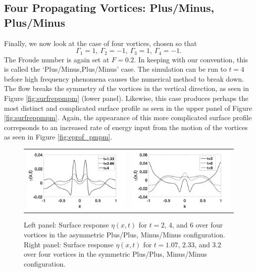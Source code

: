 \documentclass[a4paper,11pt]{article}
\begin{document}
\subsection{Four Propagating Vortices: Plus/Minus, Plus/Minus}
Finally, we now look at the case of four vortices, chosen so that
\[
\Gamma_{1}=1,~\Gamma_{2}=-1, ~ \Gamma_{3}=1,~\Gamma_{4}=-1.
\]
The Froude number is again set at $F=0.2$.  In keeping with our convention, this is called the `Plus/Minus,Plus/Minus' case.  The simulation can be run to $t=4$ before high frequency phenomena causes the numerical method to break down.  The flow breaks the symmetry of the vortices in the vertical direction, as seen in Figure \ref{fig:surfreppmpm} (lower panel).
Likewise, this case produces perhaps the most distinct and complicated surface profile as seen in the upper panel of
Figure \ref{fig:surfreppmpm}.  Again, the appearance of this more complicated surface profile correpsonds to an increased rate of energy input from the motion of the vortices as seen in Figure \ref{fig:eprof_pmpm}.
\begin{figure}[!h]
\centering
\begin{tabular}{cc}
\includegraphics[width=.5\textwidth]{surf_resp_mu_pt2_F_pt2_pmpm} & 
\includegraphics[width=.5\textwidth]{surf_resp_mu_pt2_F_pt2_pmpm_sym}
\end{tabular}
\caption{\small Left panel: Surface response $\eta(x,t)$ for $t=2$, $4$, and $6$ over four vortices in the asymmetric Plus/Plus, Minus/Minus configuration.
Right panel: Surface response $\eta(x,t)$ for $t=1.07$, $2.33$, and $3.2$ over four vortices in the symmetric Plus/Plus, Minus/Minus configuration.}
\label{fig:surfrepmpm}
\end{figure}
%
\end{document}
